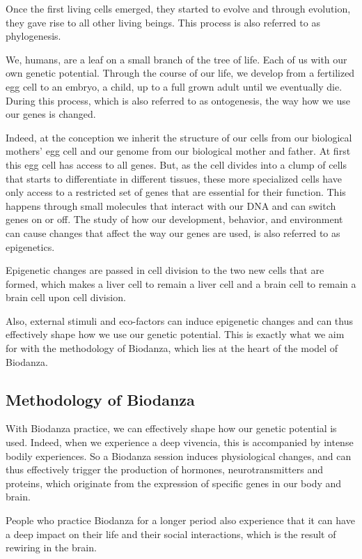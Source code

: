 \documentclass[
  11pt,
]{book}
\begin{document}
Once the first living cells emerged, they started to evolve and through evolution, they gave rise to all other living beings. This process is also referred to as phylogenesis.

We, humans, are a leaf on a small branch of the tree of life. Each of us with our own genetic potential. Through the course of our life, we develop from a fertilized egg cell to an embryo, a child, up to a full grown adult until we eventually die. During this process, which is also referred to as ontogenesis, the way how we use our genes is changed.

Indeed, at the conception we inherit the structure of our cells from our biological mothers' egg cell and our genome from our biological mother and father. At first this egg cell has access to all genes. But, as the cell divides into a clump of cells that starts to differentiate in different tissues, these more specialized cells have only access to a restricted set of genes that are essential for their function. This happens through small molecules that interact with our DNA and can switch genes on or off.
The study of how our development, behavior, and environment can cause changes that affect the way our genes are used, is also referred to as epigenetics.

Epigenetic changes are passed in cell division to the two new cells that are formed, which makes a liver cell to remain a liver cell and a brain cell to remain a brain cell upon cell division.

Also, external stimuli and eco-factors can induce epigenetic changes and can thus effectively shape how we use our genetic potential. This is exactly what we aim for with the methodology of Biodanza, which lies at the heart of the model of Biodanza.

\hypertarget{methodology-of-biodanza}{%
\subsection{Methodology of Biodanza}\label{methodology-of-biodanza}}

With Biodanza practice, we can effectively shape how our genetic potential is used. Indeed, when we experience a deep vivencia, this is accompanied by intense bodily experiences. So a Biodanza session induces physiological changes, and can thus effectively trigger the production of hormones, neurotransmitters and proteins, which originate from the expression of specific genes in our body and brain.

People who practice Biodanza for a longer period also experience that it can have a deep impact on their life and their social interactions, which is the result of rewiring in the brain.
\end{document}
